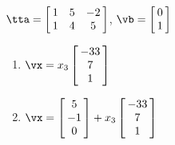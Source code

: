 {$\tta = \left[\hskip -3pt \begin{array}{ccc} 1&5&-2\\  1&4&5
\end{array}\hskip -3pt \right]$, $\vb=\left[\hskip -3pt \begin{array}{c} 0\\  1\end{array}\hskip -3pt \right]$}
{\begin{enumerate}
\item	 $\vx=x_3\left[\hskip -3pt \begin{array}{c} -33\\  7\\  1\end {array} \hskip -3pt
\right]$
\item	 $\vx=\left[\hskip -3pt \begin{array}{c} 5\\  -1\\  0\end{array}\hskip -3pt \right]+x_3\left[\hskip -3pt \begin{array}{c} -33\\  7\\  1\end {array} \hskip -3pt
\right]$
\end{enumerate} 
 }


 

 


 

 






